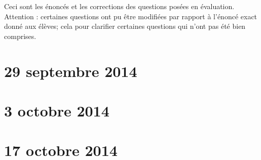 

\begin{center}
    Ceci sont les énoncés et les corrections des questions posées en évaluation. Attention : certaines questions ont pu être modifiées par rapport à l'énoncé exact donné aux élèves; cela pour clarifier certaines questions qui n'ont pas été bien comprises.
\end{center}


\section{29 septembre 2014}


\section{3 octobre 2014}


\section{17 octobre 2014}


